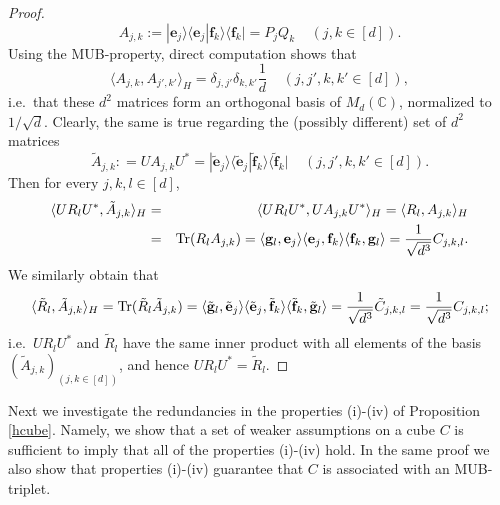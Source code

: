 \documentclass[12pt]{amsart}
\numberwithin{equation}{section}
\theoremstyle{definition}
\theoremstyle{remark}
\theoremstyle{remark}
\newcommand{\CC}{\ensuremath{\mathbb{C}}}
\newcommand{\gb}{\ensuremath{\mathbf{g}}}
\newcommand{\eb}{\ensuremath{\mathbf{e}}}
\newcommand{\fb}{\ensuremath{\mathbf{f}}}
\begin{document}
\begin{proof}
\begin{equation}\label{pq}
A_{j,k} := | \eb_j\rangle\langle\eb_j|
\fb_k\rangle\langle\fb_k|=P_jQ_k\;\;\;\;
(j,k\in [d]).    
\end{equation}
Using the MUB-property, direct computation shows that 
\begin{equation}
\label{eq:A_jk}
\langle A_{j,k},A_{j',k'}\rangle_{H}
 = \delta_{j,j'}\delta_{k,k'}
 \frac{1}{d}\;\;\;\; (j,j',k,k'\in [d]),    
\end{equation}
i.e.\ that these $d^2$ matrices form an orthogonal basis of $M_d(\CC)$, normalized to $1/\sqrt{d}$. Clearly, the same
is true regarding the (possibly different) set of $d^2$ matrices $$\tilde{A}_{j,k}: = UA_{j,k}U^* = | \tilde{\eb}_j\rangle\langle\tilde{\eb}_j|
\tilde{\fb}_k\rangle\langle\tilde{\fb}_k|\;\;\;\; (j,j',k,k'\in [d]).$$  
Then for every $j,k,l\in [d]$,
\begin{eqnarray}
\nonumber
\langle UR_lU^*,\tilde{A}_{j,k}\rangle_{H}
&=& \langle UR_lU^*,UA_{j,k}U^*\rangle_{H}
=\langle R_l,A_{j,k}\rangle_{H} \\
&=&{\rm Tr}(R_lA_{j,k})=
\langle \gb_l, \eb_j\rangle 
\langle \eb_j, \fb_k\rangle 
\langle \fb_k, \gb_l\rangle
=\frac{1}{\sqrt{d^3}}C_{j,k,l}.
\end{eqnarray}
We similarly  obtain that 
$$
\langle \tilde{R}_l,\tilde{A}_{j,k}\rangle_{H} ={\rm Tr}(\tilde{R}_l\tilde{A}_{j,k})=
\langle \tilde{\gb}_l, \tilde{\eb}_j\rangle 
\langle \tilde{\eb}_j, \tilde{\fb}_k\rangle 
\langle \tilde{\fb}_k, \tilde{\gb}_l\rangle
=\frac{1}{\sqrt{d^3}}\tilde{C}_{j,k,l}=\frac{1}{\sqrt{d^3}}C_{j,k,l};
$$
i.e.\ $UR_lU^*$ and $\tilde{R}_l$
have the same inner product with all elements of the basis $(\tilde{A}_{j,k})_{(j,k\in[d])}$,
and hence $UR_lU^*= \tilde{R}_l$.
\end{proof}



Next we investigate the redundancies in the properties (i)-(iv) of Proposition \ref{hcube}. Namely, we show that a set of weaker assumptions on a cube $C$ is sufficient to imply that all of the properties (i)-(iv) hold. In the same proof we also show that properties (i)-(iv)  guarantee that $C$ is associated with an MUB-triplet. 

\medskip
\end{document}
